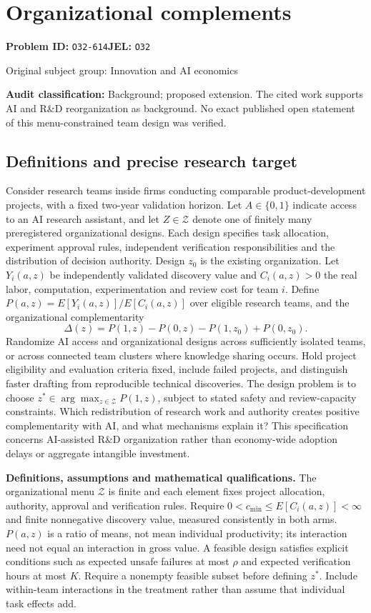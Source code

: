 \documentclass[11pt,a4paper]{article}
\begin{document}
\section*{Organizational complements}
\textbf{Problem ID:} \texttt{O32-614}\quad \textbf{JEL:} \texttt{O32}\par
\label{problem:OP-0414}
{\sffamily\small\color{muted}Original subject group: Innovation and AI economics\par}
\label{definitions:problem:30007696}
\textbf{Audit classification:} Background; proposed extension. The cited work supports AI and R\&D reorganization as background. No exact published open statement of this menu-constrained team design was verified.
\subsection*{Definitions and precise research target}
Consider research teams inside firms conducting comparable product-development projects, with a fixed two-year validation horizon. Let \(A\in\{0,1\}\) indicate access to an AI research assistant, and let \(Z\in\mathcal Z\) denote one of finitely many preregistered organizational designs. Each design specifies task allocation, experiment approval rules, independent verification responsibilities and the distribution of decision authority. Design \(z_0\) is the existing organization. Let \(Y_i(a,z)\) be independently validated discovery value and \(C_i(a,z)>0\) the real labor, computation, experimentation and review cost for team \(i\). Define \(P(a,z)=E[Y_i(a,z)]/E[C_i(a,z)]\) over eligible research teams, and the organizational complementarity
\[
\Delta(z)=P(1,z)-P(0,z)-P(1,z_0)+P(0,z_0).
\]
Randomize AI access and organizational designs across sufficiently isolated teams, or across connected team clusters where knowledge sharing occurs. Hold project eligibility and evaluation criteria fixed, include failed projects, and distinguish faster drafting from reproducible technical discoveries. The design problem is to choose \(z^\ast\in\arg\max_{z\in\mathcal Z}P(1,z)\), subject to stated safety and review-capacity constraints. Which redistribution of research work and authority creates positive complementarity with AI, and what mechanisms explain it? This specification concerns AI-assisted R\&D organization rather than economy-wide adoption delays or aggregate intangible investment.

\textbf{Definitions, assumptions and mathematical qualifications.} The organizational menu \(\mathcal Z\) is finite and each element fixes project allocation, authority, approval and verification rules. Require \(0<c_{\min}\leq E[C_i(a,z)]<\infty\) and finite nonnegative discovery value, measured consistently in both arms. \(P(a,z)\) is a ratio of means, not mean individual productivity; its interaction need not equal an interaction in gross value. A feasible design satisfies explicit conditions such as expected unsafe failures at most \(\rho\) and expected verification hours at most \(K\). Require a nonempty feasible subset before defining \(z^*\). Include within-team interactions in the treatment rather than assume that individual task effects add.
\end{document}
